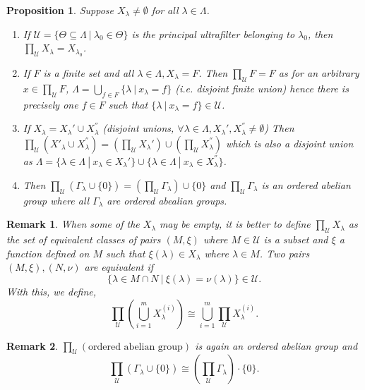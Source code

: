 \documentclass[8pt]{article}
\numberwithin{equation}{section}
\newtheorem{proposition}{Proposition}[subsection]
\newtheorem{remark}{Remark}[subsection]
\newcommand{\U}[0]{\mathcal{U}}
\newcommand{\sep}[0]{\:|\:}
\begin{document}
\begin{proposition}
    \label{fact_5_2}
    Suppose $X_\lambda\not=\emptyset$ for all $\lambda\in\Lambda$.
    \begin{enumerate}
        \item If $\U=\{\Theta\subseteq\Lambda\sep\lambda_0\in\Theta\}$ is the principal ultrafilter belonging to $\lambda_0$, then $\prod_\U X_\lambda=X_{\lambda_0}$.
        \item If $F$ is a finite set and all $\lambda\in\Lambda,X_\lambda=F$. Then $\prod_\U F = F$ as for an arbitrary $x\in\prod_\U F$, $\Lambda = \bigcup_{f\in F}\{\lambda\sep x_\lambda =f\}$ (i.e. disjoint finite union) hence there is precisely one $f\in F$ such that $\{\lambda\sep x_\lambda=f\}\in\U$.
        \item If $X_\lambda = X_\lambda'\cup X_\lambda^{''}$ (disjoint unions, $\forall \lambda\in\Lambda, X_\lambda',X^{''}_\lambda\not=\emptyset$) Then $\prod_{\U}(X'_\lambda\cup X^{''}_\lambda) = (\prod_\U X_\lambda')\cup(\prod_\U X^{''}_\lambda)$ which is also a disjoint union as $\Lambda = \{\lambda\in\Lambda\sep x_\lambda\in X_\lambda'\}\cup\{\lambda\in\Lambda\sep x_\lambda\in X_\lambda^{''}\}$.
        \item Then $\prod_\U(\Gamma_\lambda\cup\{0\}) = (\prod_\U\Gamma_\lambda)\cup\{0\}$ and $\prod_\U\Gamma_\lambda$ is an ordered abelian group where all $\Gamma_\lambda$ are ordered abealian groups.
    \end{enumerate}
\end{proposition}
\begin{remark}
    When some of the $X_\lambda$ may be empty, it is better to define $\prod_{\U}X_\lambda$ as the set of equivalent classes of pairs $(M,\xi)$ where $M\in\U$ is a subset and $\xi$ a function defined on $M$ such that $\xi(\lambda)\in X_\lambda$ where $\lambda\in M$. Two pairs $(M,\xi),(N,\nu)$ are equivalent if 
    \begin{equation*}
        \{\lambda\in M\cap N\sep \xi(\lambda) = \nu(\lambda)\}\in\U.
    \end{equation*}
    With this, we define,
    \begin{equation*}
        \prod_\U\left(\bigcup_{i=1}^m X_\lambda^{(i)}\right)\cong \bigcup_{i=1}^m\prod_\U X_\lambda^{(i)}.
    \end{equation*}
\end{remark}
\begin{remark}
    $\prod_\U(\text{ordered abelian group})$ is again an ordered abelian group and 
    \begin{equation*}
        \prod_\U (\Gamma_\lambda\cup\{0\}) \cong \left(\prod_\U\Gamma_\lambda\right)\cdot\{0\}.
    \end{equation*}
\end{remark}
\end{document}
